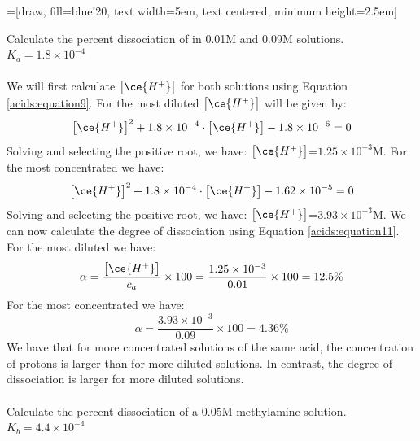 \documentclass[main.tex]{subfiles}
\newcommand\chapterlabel{acids}
\begin{document}
\begin{description}
\begin{center}
=[draw, fill=blue!20, text width=5em, 
    text centered, minimum height=2.5em]
\end{center}

\begin{example} %
Calculate the percent dissociation of  in 0.01M and 0.09M solutions. $K_a=1.8 \times 10^{-4}$
\\
\\
We will first calculate $\big[ \ce{H^+} \big]$ for both solutions using Equation \ref{\chapterlabel:equation9}. For the most diluted $\big[ \ce{H^+} \big]$ will be given by:
\[\big[ \ce{H^+} \big]^2 +1.8 \times 10^{-4}\cdot \big[ \ce{H^+} \big] -1.8 \times 10^{-6}=0\]
Solving and selecting the positive root, we have: $\big[ \ce{H^+} \big]$=$1.25\times 10^{-3}$M. For the most concentrated we have:
\[\big[ \ce{H^+} \big]^2 +1.8 \times 10^{-4}\cdot \big[ \ce{H^+} \big] -1.62 \times 10^{-5}=0\]
Solving and selecting the positive root, we have: $\big[ \ce{H^+} \big]$=$3.93\times 10^{-3}$M. We can now calculate the degree of dissociation using Equation \ref{\chapterlabel:equation11}. For the most diluted we have:
\[\alpha=\frac{\big[ \ce{H^+} \big]}{c_a}\times 100=\frac{1.25\times 10^{-3}	}{0.01}\times 100=12.5\%\]
For the most concentrated we have:
\[\alpha=\frac{3.93\times 10^{-3}	}{0.09}\times 100=4.36\%\]
We have that for more concentrated solutions of the same acid, the concentration of protons is larger than for more diluted solutions. In contrast, the degree of dissociation is larger for more diluted solutions.
\\
\faDiamond\ \\
Calculate the percent dissociation of a 0.05M methylamine  solution. $K_b=4.4 \times 10^{-4}$
\end{example}%



\end{description}
\end{document}
